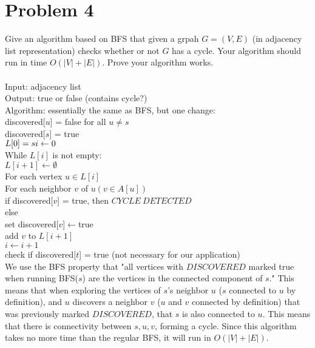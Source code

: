 \documentclass[11pt,letterpaper]{article}
\newcommand\tab[1][1cm]{\hspace*{#1}}
\begin{document}
\pagebreak

\section{Problem 4}
Give an algorithm based on BFS that given a grpah $G=(V,E)$ (in adjacency list representation) checks whether or not $G$ has a cycle. Your algorithm should run in time $O(|V|+|E|)$. Prove your algorithm works. \\\\
Input: adjacency list \\
Output: true or false (contains cycle?) \\
Algorithm: essentially the same as BFS, but one change: \\
discovered[$u$] = false for all $u \neq s$ \\
discovered[$s$] = true \\
$L[0]=s\\ 
i\leftarrow0$ \\ 
While $L[i]$ is not empty: \\
\tab $L[i+1]\leftarrow \emptyset$ \\
\tab For each vertex $u \in L[i]$ \\
\tab \tab For each neighbor $v$ of $u (v \in A[u])$ \\
\tab \tab \tab if discovered[$v$] = true, then $CYCLE \ DETECTED$ \\
\tab \tab \tab else \\
\tab \tab \tab \tab set discovered[$v$]$\leftarrow$true\\
\tab \tab \tab \tab add $v$ to $L[i+1]$ \\
\tab \tab $i \leftarrow i+1$ \\
check if discovered[$t$] = true (not necessary for our application) \\
We use the BFS property that "all vertices with $DISCOVERED$ marked true when running BFS($s$) are the vertices in the connected component of $s$." This means that when exploring the vertices of $s$'s neighbor $u$ ($s$ connected to $u$ by definition), and $u$ discovers a neighbor $v$ ($u$ and $v$ connected by definition) that was previously marked $DISCOVERED$, that $s$ is also connected to $u$. This means that there is connectivity between $s, u, v$, forming a cycle. Since this algorithm takes no more time than the regular BFS, it will run in $O(|V|+|E|)$. \\ 
\end{document}
